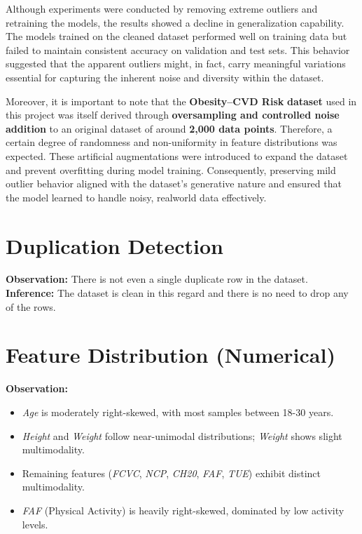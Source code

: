 Although experiments were conducted by removing extreme outliers and retraining the models, the results showed a decline in generalization capability.
The models trained on the cleaned dataset performed well on training data but failed to maintain consistent accuracy on validation and test sets.
This behavior suggested that the apparent outliers might, in fact, carry meaningful variations essential for capturing the inherent noise and diversity within the dataset.

Moreover, it is important to note that the \textbf{Obesity–CVD Risk} \textbf{dataset} used in this project was itself derived through \textbf{oversampling and controlled noise addition} to an original dataset of around \textbf{2,000 data points}.
Therefore, a certain degree of randomness and non-uniformity in feature distributions was expected.
These artificial augmentations were introduced to expand the dataset and prevent overfitting during model training.
Consequently, preserving mild outlier behavior aligned with the dataset’s generative nature and ensured that the model learned to handle noisy, realworld data effectively.



\section{Duplication Detection}\label{sec:duplication-detection}
\textbf{Observation:} There is not even a single duplicate row in the dataset.\\
\textbf{Inference:} The dataset is clean in this regard and there is no need to drop any of the rows.



\section{Feature Distribution (Numerical)}\label{sec:feature-distribution-numerical}

\textbf{Observation:}
\begin{itemize}
    \item \textit{Age} is moderately right-skewed, with most samples between 18-30 years.
    \item \textit{Height} and \textit{Weight} follow near-unimodal distributions; \textit{Weight} shows slight multimodality.
    \item Remaining features (\textit{FCVC}, \textit{NCP}, \textit{CH20}, \textit{FAF}, \textit{TUE}) exhibit distinct multimodality.
    \item \textit{FAF} (Physical Activity) is heavily right-skewed, dominated by low activity levels.
\end{itemize}

